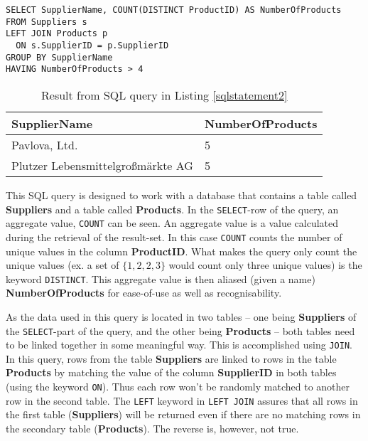 \begin{lstlisting}[caption={SQL Query to retrieve all suppliers carrying more
      than four products.},label={sqlstatement2}]
SELECT SupplierName, COUNT(DISTINCT ProductID) AS NumberOfProducts
FROM Suppliers s
LEFT JOIN Products p
  ON s.SupplierID = p.SupplierID
GROUP BY SupplierName
HAVING NumberOfProducts > 4
\end{lstlisting}

\begin{table}[h]
  \centering
  \begin{tabular}{ | l | l | }
    \hline
    \textbf{SupplierName} & \textbf{NumberOfProducts} \\
    \hline
    Pavlova, Ltd. & 5  \\
    \hline
    Plutzer Lebensmittelgro{\ss}märkte AG & 5 \\
    \hline
  \end{tabular}
  \caption{Result from SQL query in Listing \ref{sqlstatement2}}
  \label{table:sql2}
\end{table}


This SQL query is designed to work with a database that contains a table
called \textbf{Suppliers} and a table called \textbf{Products}. In the
\texttt{SELECT}-row of the query, an aggregate value, \texttt{COUNT} can be
seen. An aggregate value is a value calculated during the retrieval of the
result-set. In this case \texttt{COUNT} counts the number of unique
values in the column \textbf{ProductID}. What makes the query only count
the unique values (ex. a set of $\{1,2,2,3\}$ would count only three unique
values) is the keyword \texttt{DISTINCT}. This aggregate value is then
aliased (given a name) \textbf{NumberOfProducts} for ease-of-use as well
as recognisability.

As the data used in this query is located in two tables -- one being
\textbf{Suppliers} of the \texttt{SELECT}-part of the query, and the
other being \textbf{Products} -- both tables need to be linked together
in some meaningful way. This is
accomplished using \texttt{JOIN}. In this query, rows from the table
\textbf{Suppliers} are linked to rows in the table \textbf{Products}
by matching the value of the column \textbf{SupplierID} in both
tables (using the keyword \texttt{ON}). Thus each row won't be
randomly matched to another row in the second table. The \texttt{LEFT}
keyword in \texttt{LEFT JOIN} assures that all rows in the first table
(\textbf{Suppliers}) will be returned even if there are no matching
rows in the secondary table (\textbf{Products}). The reverse is, however,
not true.

